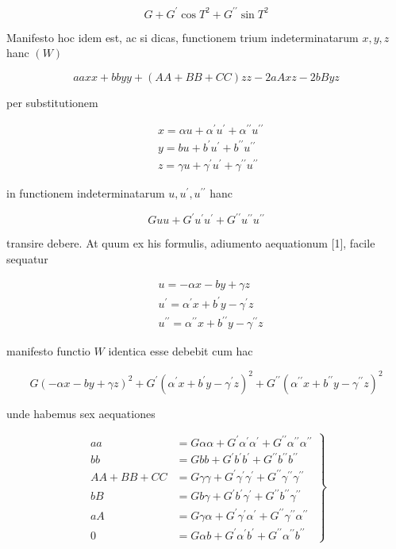 \documentclass[twoside,12pt, showframe]{memoir}
\begin{document}
\[
G+G^{\prime} \cos T^{2}+G^{\prime \prime} \sin T^{2}
\]

Manifesto hoc idem est, ac si dicas, functionem trium indeterminatarum \(x, y, z\) hanc \((W)\)

\[
a a x x+b b y y+(A A+B B+C C) z z-2 a A x z-2 b B y z
\]

per substitutionem

\[
\begin{aligned}
& x=\alpha u+\alpha^{\prime} u^{\prime}+\alpha^{\prime \prime} u^{\prime \prime} \\
& y=b u+b^{\prime} u^{\prime}+b^{\prime \prime} u^{\prime \prime} \\
& z=\gamma u+\gamma^{\prime} u^{\prime}+\gamma^{\prime \prime} u^{\prime \prime}
\end{aligned}
\]

in functionem indeterminatarum \(u, u^{\prime}, u^{\prime \prime}\) hanc

\[
G u u+G^{\prime} u^{\prime} u^{\prime}+G^{\prime \prime} u^{\prime \prime} u^{\prime \prime}
\]

transire debere. At quum ex his formulis, adiumento aequationum [1], facile sequatur

\[
\begin{aligned}
& u=-\alpha x-b y+\gamma z \\
& u^{\prime}=\alpha^{\prime} x+b^{\prime} y-\gamma^{\prime} z \\
& u^{\prime \prime}=\alpha^{\prime \prime} x+b^{\prime \prime} y-\gamma^{\prime \prime} z
\end{aligned}
\]

manifesto functio \(W\) identica esse debebit cum hac

\[
G(-\alpha x-b y+\gamma z)^{2}+G^{\prime}\left(\alpha^{\prime} x+b^{\prime} y-\gamma^{\prime} z\right)^{2}+G^{\prime \prime}\left(\alpha^{\prime \prime} x+b^{\prime \prime} y-\gamma^{\prime \prime} z\right)^{2}
\]

unde habemus sex aequationes

\[
\left.\begin{array}{rl}
a a & =G \alpha \alpha+G^{\prime} \alpha^{\prime} \alpha^{\prime}+G^{\prime \prime} \alpha^{\prime \prime} \alpha^{\prime \prime} \\
b b & =G b b+G^{\prime} b^{\prime} b^{\prime}+G^{\prime \prime} b^{\prime \prime} b^{\prime \prime} \\
A A+B B+C C & =G \gamma \gamma+G^{\prime} \gamma^{\prime} \gamma^{\prime}+G^{\prime \prime} \gamma^{\prime \prime} \gamma^{\prime \prime} \\
b B & =G b \gamma+G^{\prime} b^{\prime} \gamma^{\prime}+G^{\prime \prime} b^{\prime \prime} \gamma^{\prime \prime} \\
a A & =G \gamma \alpha+G^{\prime} \gamma^{\prime} \alpha^{\prime}+G^{\prime \prime} \gamma^{\prime \prime} \alpha^{\prime \prime} \\
0 & =G \alpha b+G^{\prime} \alpha^{\prime} b^{\prime}+G^{\prime \prime} \alpha^{\prime \prime} b^{\prime \prime}
\end{array}\right\}
\]
\end{document}
